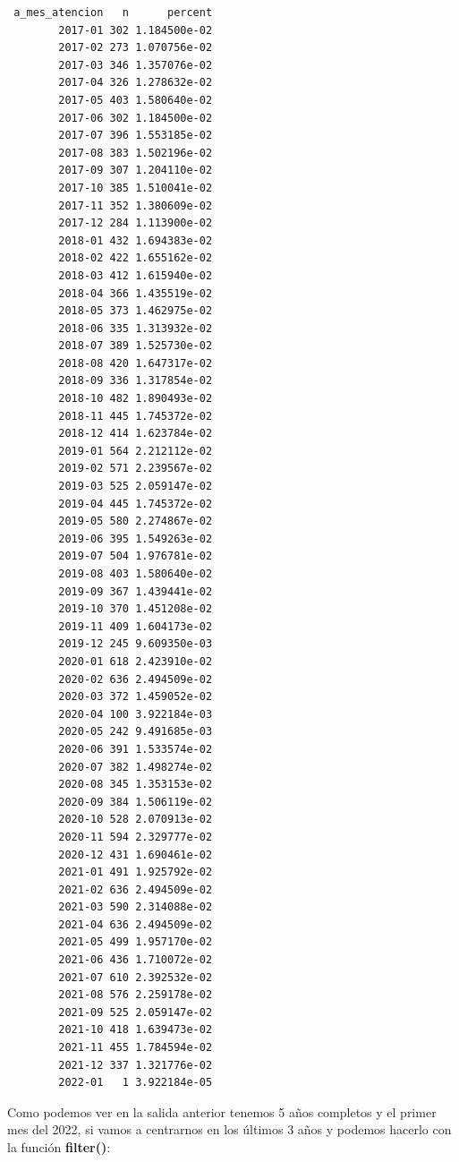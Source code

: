 \documentclass[
  letterpaper,
  DIV=11,
  numbers=noendperiod]{scrreprt}
\begin{document}
\begin{verbatim}
 a_mes_atencion   n      percent
        2017-01 302 1.184500e-02
        2017-02 273 1.070756e-02
        2017-03 346 1.357076e-02
        2017-04 326 1.278632e-02
        2017-05 403 1.580640e-02
        2017-06 302 1.184500e-02
        2017-07 396 1.553185e-02
        2017-08 383 1.502196e-02
        2017-09 307 1.204110e-02
        2017-10 385 1.510041e-02
        2017-11 352 1.380609e-02
        2017-12 284 1.113900e-02
        2018-01 432 1.694383e-02
        2018-02 422 1.655162e-02
        2018-03 412 1.615940e-02
        2018-04 366 1.435519e-02
        2018-05 373 1.462975e-02
        2018-06 335 1.313932e-02
        2018-07 389 1.525730e-02
        2018-08 420 1.647317e-02
        2018-09 336 1.317854e-02
        2018-10 482 1.890493e-02
        2018-11 445 1.745372e-02
        2018-12 414 1.623784e-02
        2019-01 564 2.212112e-02
        2019-02 571 2.239567e-02
        2019-03 525 2.059147e-02
        2019-04 445 1.745372e-02
        2019-05 580 2.274867e-02
        2019-06 395 1.549263e-02
        2019-07 504 1.976781e-02
        2019-08 403 1.580640e-02
        2019-09 367 1.439441e-02
        2019-10 370 1.451208e-02
        2019-11 409 1.604173e-02
        2019-12 245 9.609350e-03
        2020-01 618 2.423910e-02
        2020-02 636 2.494509e-02
        2020-03 372 1.459052e-02
        2020-04 100 3.922184e-03
        2020-05 242 9.491685e-03
        2020-06 391 1.533574e-02
        2020-07 382 1.498274e-02
        2020-08 345 1.353153e-02
        2020-09 384 1.506119e-02
        2020-10 528 2.070913e-02
        2020-11 594 2.329777e-02
        2020-12 431 1.690461e-02
        2021-01 491 1.925792e-02
        2021-02 636 2.494509e-02
        2021-03 590 2.314088e-02
        2021-04 636 2.494509e-02
        2021-05 499 1.957170e-02
        2021-06 436 1.710072e-02
        2021-07 610 2.392532e-02
        2021-08 576 2.259178e-02
        2021-09 525 2.059147e-02
        2021-10 418 1.639473e-02
        2021-11 455 1.784594e-02
        2021-12 337 1.321776e-02
        2022-01   1 3.922184e-05
\end{verbatim}

Como podemos ver en la salida anterior tenemos 5 años completos y el
primer mes del 2022, si vamos a centrarnos en los últimos 3 años y
podemos hacerlo con la función \textbf{filter()}:
\end{document}
